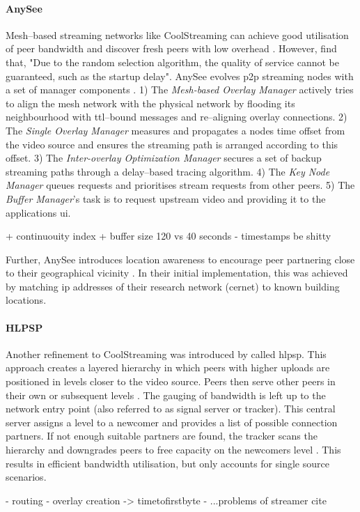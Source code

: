 \paragraph{AnySee}
Mesh–based streaming networks like CoolStreaming can achieve good utilisation of peer bandwidth and discover fresh peers with low overhead \cite[\S{II}]{anysee}. However, \citet[\S{III}]{anysee} find that, "Due to the random selection algorithm, the quality of service cannot be guaranteed, such as the startup delay". AnySee evolves \gls{p2p} streaming nodes with a set of manager components \citep[\S{III.B-F}]{anysee}. 1) The \textit{Mesh-based Overlay Manager} actively tries to align the mesh network with the physical network by flooding its neighbourhood with \gls{ttl}–bound messages and re–aligning overlay connections. 2) The \textit{Single Overlay Manager} measures and propagates a nodes time offset from the video source and ensures the streaming path is arranged according to this offset. 3) The \textit{Inter-overlay Optimization Manager} secures a set of backup streaming paths through a delay–based tracing algorithm. 4) The \textit{Key Node Manager} queues requests and prioritises stream requests from other peers. 5) The \textit{Buffer Manager}'s task is to request upstream video and providing it to the applications \gls{ui}.

+ continuouity index
+ buffer size 120 vs 40 seconds
- timestamps be shitty

Further, AnySee introduces location awareness to encourage peer partnering close to their geographical vicinity \citep[\S{V.B.1}]{anysee}. In their initial implementation, this was achieved by matching \gls{ip} addresses of their research network (\gls{cernet}) to known building locations.

\paragraph{HLPSP}
Another refinement to CoolStreaming was introduced by \citet*{hlpsp} called \gls{hlpsp}. This approach creates a layered hierarchy in which peers with higher uploads are positioned in levels closer to the video source. Peers then serve other peers in their own or subsequent levels \cite[\S3]{hlpsp}. The gauging of bandwidth is left up to the network entry point (also referred to as signal server or tracker). This central server assigns a level to a newcomer and provides a list of possible connection partners. If not enough suitable partners are found, the tracker scans the hierarchy and downgrades peers to free capacity on the newcomers level \cite[\S3.3.2]{hlpsp}. This results in efficient bandwidth utilisation, but only accounts for single source scenarios.

- routing
- overlay creation -> timetofirstbyte
- ...problems of streamer cite
